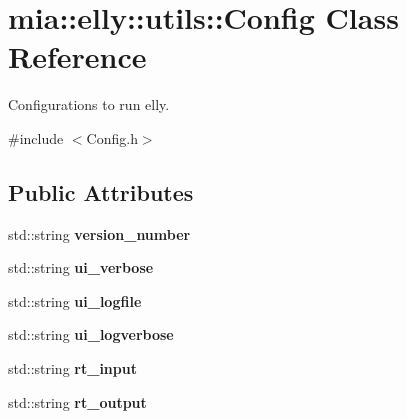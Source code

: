 \hypertarget{classmia_1_1elly_1_1utils_1_1_config}{\section{mia\-:\-:elly\-:\-:utils\-:\-:Config Class Reference}
\label{classmia_1_1elly_1_1utils_1_1_config}
}


Configurations to run elly.  




{\ttfamily \#include $<$Config.\-h$>$}

\subsection*{Public Attributes}
\begin{DoxyCompactItemize}
\item 
\hypertarget{classmia_1_1elly_1_1utils_1_1_config_a39bcb2abda96acaf66b1c176e6ce63cb}{std\-::string {\bfseries version\-\_\-number}}\label{classmia_1_1elly_1_1utils_1_1_config_a39bcb2abda96acaf66b1c176e6ce63cb}

\item 
\hypertarget{classmia_1_1elly_1_1utils_1_1_config_a2c0b3e7d0478530afb5e031647f4d6ca}{std\-::string {\bfseries ui\-\_\-verbose}}\label{classmia_1_1elly_1_1utils_1_1_config_a2c0b3e7d0478530afb5e031647f4d6ca}

\item 
\hypertarget{classmia_1_1elly_1_1utils_1_1_config_a6a6fd92e60395b6cf875ed8a6782e29b}{std\-::string {\bfseries ui\-\_\-logfile}}\label{classmia_1_1elly_1_1utils_1_1_config_a6a6fd92e60395b6cf875ed8a6782e29b}

\item 
\hypertarget{classmia_1_1elly_1_1utils_1_1_config_aa6cf2371478ffbe27d74a489f102d006}{std\-::string {\bfseries ui\-\_\-logverbose}}\label{classmia_1_1elly_1_1utils_1_1_config_aa6cf2371478ffbe27d74a489f102d006}

\item 
\hypertarget{classmia_1_1elly_1_1utils_1_1_config_a6e0dd458d30629613b2fe131a1aca048}{std\-::string {\bfseries rt\-\_\-input}}\label{classmia_1_1elly_1_1utils_1_1_config_a6e0dd458d30629613b2fe131a1aca048}

\item 
\hypertarget{classmia_1_1elly_1_1utils_1_1_config_abab18c0b0e4819432851e764ee8b0091}{std\-::string {\bfseries rt\-\_\-output}}\label{classmia_1_1elly_1_1utils_1_1_config_abab18c0b0e4819432851e764ee8b0091}


\end{DoxyCompactItemize}

